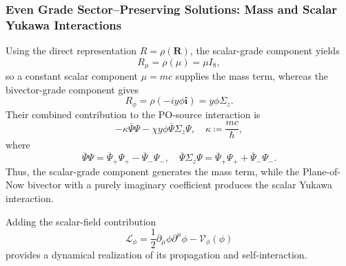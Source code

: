 \subsubsection{Even Grade Sector--Preserving Solutions: Mass and Scalar Yukawa Interactions}
Using the direct representation $R=\rho(\mathbf{R})$, the scalar-grade component yields
\begin{equation}
    R_{\mu} = \rho(\mu) = \mu I_{8},
\end{equation}
so a constant scalar component $\mu = mc$ supplies the mass term, whereas the bivector-grade component gives
\begin{equation}
    R_{\phi} = \rho(-iy\phi\mathbf{i}) = y\phi\Sigma_{z}.
\end{equation}
Their combined contribution to the PO-source interaction is
\begin{equation}\label{eq_scalar_yukawa_interaction}
    -\kappa\bar{\Psi}\Psi - \chi y\phi\bar{\Psi}\Sigma_{z}\Psi, \quad \kappa \coloneqq \frac{mc}{\hbar},
\end{equation}
where
\begin{equation}
    \bar{\Psi}\Psi = \bar{\Psi}_{+}\Psi_{+} - \bar{\Psi}_{-}\Psi_{-}, \quad \bar{\Psi}\Sigma_{z}\Psi = \bar{\Psi}_{+}\Psi_{+} + \bar{\Psi}_{-}\Psi_{-}.
\end{equation}
Thus, the scalar-grade component generates the mass term, while the Plane-of-Now bivector with a purely imaginary coefficient produces the scalar Yukawa interaction.

Adding the scalar-field contribution
\begin{equation}
    \mathcal{L}_{\phi} = \frac{1}{2}\partial_{\mu}\phi\partial^{\mu}\phi - \mathcal{V}_{\phi}(\phi)
\end{equation}
provides a dynamical realization of its propagation and self-interaction.

